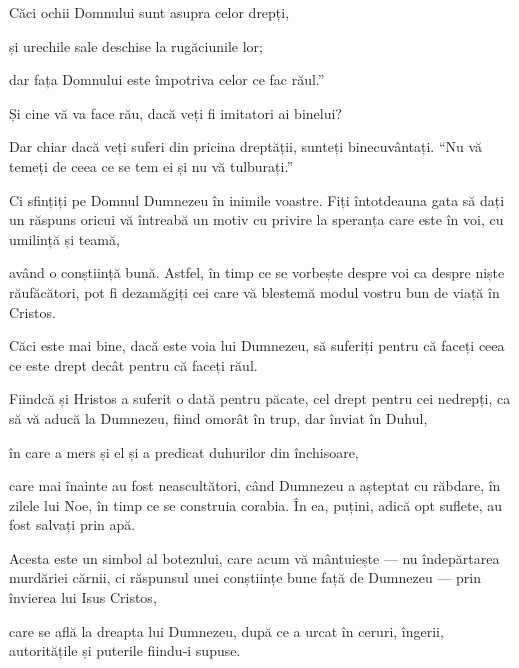 {\par }{\Q {}Căci ochii Domnului sunt asupra celor drepți,

\par }{\QB și urechile sale deschise la rugăciunile lor;

\par }{\QB dar fața Domnului este împotriva celor ce fac răul.”


\par }{\PP {}Și cine vă va face rău, dacă veți fi imitatori ai binelui?

Dar chiar dacă veți suferi din pricina dreptății, sunteți binecuvântați. “Nu vă temeți de ceea ce se tem ei și nu vă tulburați.”

Ci sfințiți pe Domnul Dumnezeu în inimile voastre. Fiți întotdeauna gata să dați un răspuns oricui vă întreabă un motiv cu privire la speranța care este în voi, cu umilință și teamă,

având o conștiință bună. Astfel, în timp ce se vorbește despre voi ca despre niște răufăcători, pot fi dezamăgiți cei care vă blestemă modul vostru bun de viață în Cristos.

Căci este mai bine, dacă este voia lui Dumnezeu, să suferiți pentru că faceți ceea ce este drept decât pentru că faceți răul.

Fiindcă și Hristos a suferit o dată pentru păcate, cel drept pentru cei nedrepți, ca să vă aducă la Dumnezeu, fiind omorât în trup, dar înviat în Duhul,

în care a mers și el și a predicat duhurilor din închisoare,

care mai înainte au fost neascultători, când Dumnezeu a așteptat cu răbdare, în zilele lui Noe, în timp ce se construia corabia. În ea, puțini, adică opt suflete, au fost salvați prin apă.

Acesta este un simbol al botezului, care acum vă mântuiește — nu îndepărtarea murdăriei cărnii, ci răspunsul unei conștiințe bune față de Dumnezeu — prin învierea lui Isus Cristos,

care se află la dreapta lui Dumnezeu, după ce a urcat în ceruri, îngerii, autoritățile și puterile fiindu-i supuse.



\par }
